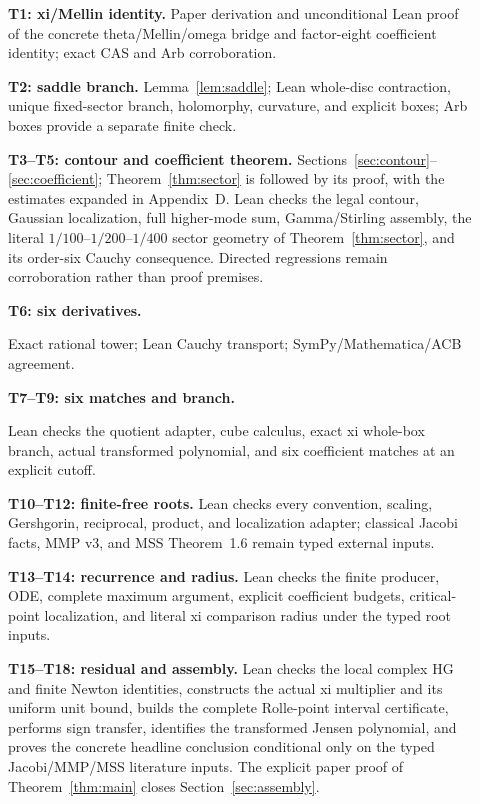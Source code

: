 \documentclass[12pt]{article}
\begin{document}
\begin{description}
\item[]\textbf{T1: xi/Mellin identity.} Paper derivation and unconditional Lean
proof of the concrete theta/Mellin/omega bridge and factor-eight coefficient
identity; exact CAS and Arb corroboration.
\item[]\textbf{T2: saddle branch.} Lemma~\ref{lem:saddle}; Lean whole-disc
contraction, unique fixed-sector branch, holomorphy, curvature, and explicit
boxes; Arb boxes provide a separate finite check.
\item[]\textbf{T3--T5: contour and coefficient theorem.}
Sections~\ref{sec:contour}--\ref{sec:coefficient}; Theorem~\ref{thm:sector}
is followed by its proof, with the estimates expanded in Appendix~D.
Lean checks the legal contour, Gaussian localization, full higher-mode sum,
Gamma/Stirling assembly, the literal $1/100$--$1/200$--$1/400$ sector
geometry of Theorem~\ref{thm:sector}, and its order-six Cauchy consequence. Directed
regressions remain corroboration rather than proof premises.
\item[]\textbf{T6: six derivatives.}\par
Exact rational tower; Lean Cauchy transport;
SymPy/Mathematica/ACB agreement.
\item[]\textbf{T7--T9: six matches and branch.}\par
Lean checks the quotient adapter, cube calculus, exact xi whole-box branch,
actual transformed polynomial, and six coefficient matches at an explicit
cutoff.
\item[]\textbf{T10--T12: finite-free roots.} Lean checks every convention,
scaling, Gershgorin, reciprocal, product, and localization adapter; classical
Jacobi facts, MMP v3, and MSS Theorem~1.6 remain typed external inputs.
\item[]\textbf{T13--T14: recurrence and radius.} Lean checks the finite producer,
ODE, complete maximum argument, explicit coefficient budgets, critical-point
localization, and literal xi comparison radius under the typed root inputs.
\item[]\textbf{T15--T18: residual and assembly.} Lean checks the local
complex HG and finite Newton identities, constructs the actual xi multiplier
and its uniform unit bound, builds the complete Rolle-point interval
certificate, performs sign transfer, identifies the transformed Jensen
polynomial, and proves the concrete headline conclusion conditional only on
the typed Jacobi/MMP/MSS literature inputs.  The explicit paper proof of
Theorem~\ref{thm:main} closes Section~\ref{sec:assembly}.
\end{description}





\end{document}
